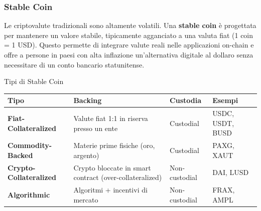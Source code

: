 \documentclass[
  italian,
  openany]{book}
\newcounter{none} %
\begin{document}
\subsubsection{Stable Coin}\label{stable-coin}

Le criptovalute tradizionali sono altamente volatili. Una \textbf{stable
coin} è progettata per mantenere un valore stabile, tipicamente
agganciato a una valuta fiat (1 coin = 1 USD). Questo permette di
integrare valute reali nelle applicazioni on-chain e offre a persone in
paesi con alta inflazione un'alternativa digitale al dollaro senza
necessitare di un conto bancario statunitense.

\begin{calloutdefinition}{Tipi di Stable Coin}

{\def\LTcaptype{none} %
\begin{longtable}[]{@{}
  >{\raggedright\arraybackslash}p{}
  >{\raggedright\arraybackslash}p{}
  >{\raggedright\arraybackslash}p{}
  >{\raggedright\arraybackslash}p{}@{}}
\toprule\noalign{}
\begin{minipage}[b]{\linewidth}\raggedright
Tipo
\end{minipage} & \begin{minipage}[b]{\linewidth}\raggedright
Backing
\end{minipage} & \begin{minipage}[b]{\linewidth}\raggedright
Custodia
\end{minipage} & \begin{minipage}[b]{\linewidth}\raggedright
Esempi
\end{minipage} \\
\midrule\noalign{}
\endhead
\bottomrule\noalign{}
\endlastfoot
\textbf{Fiat-Collateralized} & Valute fiat 1:1 in riserva presso un ente
& Custodial & USDC, USDT, BUSD \\
\textbf{Commodity-Backed} & Materie prime fisiche (oro, argento) &
Custodial & PAXG, XAUT \\
\textbf{Crypto-Collateralized} & Crypto bloccate in smart contract
(over-collateralized) & Non-custodial & DAI, LUSD \\
\textbf{Algorithmic} & Algoritmi + incentivi di mercato & Non-custodial
& FRAX, AMPL \\
\end{longtable}
}

\end{calloutdefinition}
\end{document}

